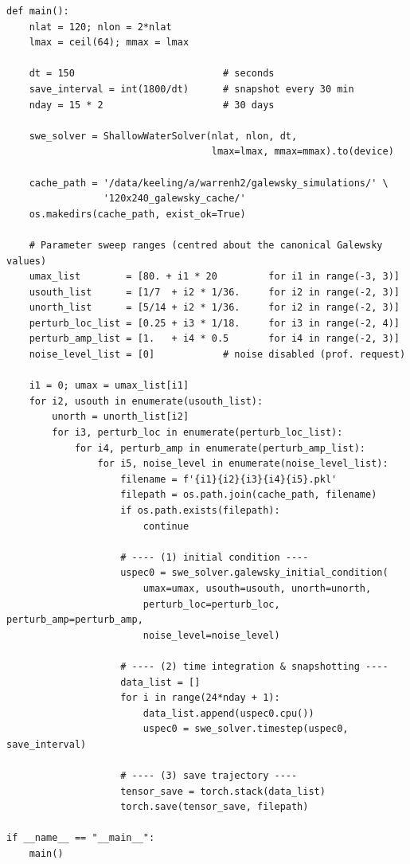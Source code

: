 \documentclass[11pt]{article}
\begin{document}
\begin{lstlisting}
def main():
    nlat = 120; nlon = 2*nlat
    lmax = ceil(64); mmax = lmax

    dt = 150                          # seconds
    save_interval = int(1800/dt)      # snapshot every 30 min
    nday = 15 * 2                     # 30 days

    swe_solver = ShallowWaterSolver(nlat, nlon, dt,
                                    lmax=lmax, mmax=mmax).to(device)

    cache_path = '/data/keeling/a/warrenh2/galewsky_simulations/' \
                 '120x240_galewsky_cache/'
    os.makedirs(cache_path, exist_ok=True)

    # Parameter sweep ranges (centred about the canonical Galewsky values)
    umax_list        = [80. + i1 * 20         for i1 in range(-3, 3)]
    usouth_list      = [1/7  + i2 * 1/36.     for i2 in range(-2, 3)]
    unorth_list      = [5/14 + i2 * 1/36.     for i2 in range(-2, 3)]
    perturb_loc_list = [0.25 + i3 * 1/18.     for i3 in range(-2, 4)]
    perturb_amp_list = [1.   + i4 * 0.5       for i4 in range(-2, 3)]
    noise_level_list = [0]            # noise disabled (prof. request)

    i1 = 0; umax = umax_list[i1]
    for i2, usouth in enumerate(usouth_list):
        unorth = unorth_list[i2]
        for i3, perturb_loc in enumerate(perturb_loc_list):
            for i4, perturb_amp in enumerate(perturb_amp_list):
                for i5, noise_level in enumerate(noise_level_list):
                    filename = f'{i1}{i2}{i3}{i4}{i5}.pkl'
                    filepath = os.path.join(cache_path, filename)
                    if os.path.exists(filepath):
                        continue

                    # ---- (1) initial condition ----
                    uspec0 = swe_solver.galewsky_initial_condition(
                        umax=umax, usouth=usouth, unorth=unorth,
                        perturb_loc=perturb_loc, perturb_amp=perturb_amp,
                        noise_level=noise_level)

                    # ---- (2) time integration & snapshotting ----
                    data_list = []
                    for i in range(24*nday + 1):
                        data_list.append(uspec0.cpu())
                        uspec0 = swe_solver.timestep(uspec0, save_interval)

                    # ---- (3) save trajectory ----
                    tensor_save = torch.stack(data_list)
                    torch.save(tensor_save, filepath)

if __name__ == "__main__":
    main()
\end{lstlisting}
\end{document}
